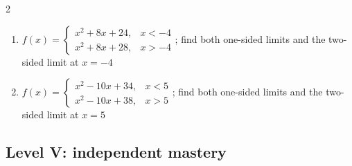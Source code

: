 \documentclass[11pt,oneside]{book}
\begin{document}
\begin{multicols}{2}
\begin{enumerate}[leftmargin=*,label=\textbf{\arabic*.},itemsep=0.65\baselineskip]
\item $f(x)=\begin{cases} x^{2} + 8 x + 24, & x<-4\\ x^{2} + 8 x + 28, & x>-4 \end{cases}$; find both one-sided limits and the two-sided limit at $x=-4$
\item $f(x)=\begin{cases} x^{2} - 10 x + 34, & x<5\\ x^{2} - 10 x + 38, & x>5 \end{cases}$; find both one-sided limits and the two-sided limit at $x=5$
\end{enumerate}
\end{multicols}
\subsection*{Level V: independent mastery}
\end{document}
